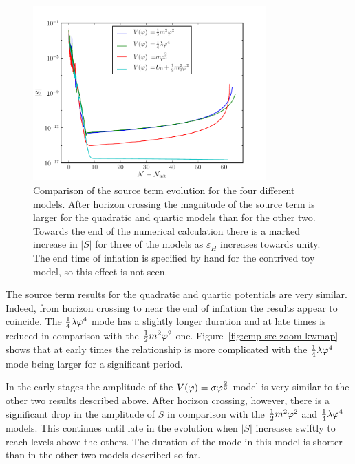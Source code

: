 \begin{figure}[htbp]
 \centering
 \includegraphics[width=0.8\textwidth]{numerical/graphs/cmp_src_kwmap-large}
 \caption[Comparison of Source Term for the Four Potentials]{Comparison of the
source term
evolution for the four different models. After horizon crossing the magnitude of the
source term is larger for the quadratic and quartic models than for the other two.
Towards the end of the numerical calculation there is a marked increase in $|S|$ for
three of the models as $\bar{\varepsilon}_H$ increases towards unity. The end time of
inflation is specified by hand for the contrived toy model, so this effect is
not seen.}
\label{fig:cmp-src-kwmap}
\end{figure}
% 

The source term results for the quadratic and quartic potentials are very similar.
Indeed, from horizon crossing to near the end of inflation the results appear to
coincide.
The $\frac{1}{4}\lambda\varphi^4$ mode has a slightly longer duration and at late times is reduced in comparison
with the $\frac{1}{2} m^2 \varphi^2$ one. Figure~\ref{fig:cmp-src-zoom-kwmap} shows that at early times the
relationship is more complicated with the $\frac{1}{4}\lambda\varphi^4$ mode being larger for a significant
period.

In the early stages the amplitude of the $V(\varphi)=\sigma\varphi^{\frac{2}{3}}$ model is very
similar to the other two
results described above. After horizon crossing, however, there is a significant drop
in the
amplitude of $S$ in comparison with the $\frac{1}{2} m^2 \varphi^2$ and $\frac{1}{4}\lambda\varphi^4$ models. This
continues
until late in the evolution when $|S|$ increases swiftly to reach levels above the
others.
The duration of the mode in this model is shorter than in the other two models
described so far. 

